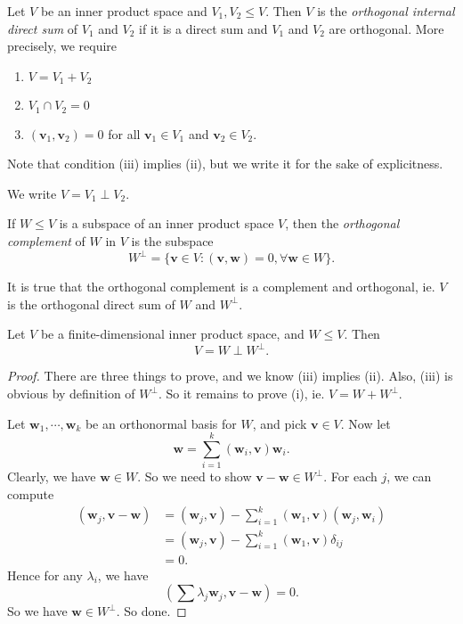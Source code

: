 \documentclass[a4paper]{article}
\begin{document}
\begin{defi}
  Let $V$ be an inner product space and $V_1, V_2 \leq V$. Then $V$ is the \emph{orthogonal internal direct sum} of $V_1$ and $V_2$ if it is a direct sum and $V_1$ and $V_2$ are orthogonal. More precisely, we require
  \begin{enumerate}
    \item $V = V_1 + V_2$
    \item $V_1 \cap V_2 = 0$
    \item $(\mathbf{v}_1, \mathbf{v}_2) = 0$ for all $\mathbf{v}_1 \in V_1$ and $\mathbf{v}_2 \in V_2$.
  \end{enumerate}
  Note that condition (iii) implies (ii), but we write it for the sake of explicitness.

  We write $V = V_1 \perp V_2$.
\end{defi}

\begin{defi}
  If $W \leq V$ is a subspace of an inner product space $V$, then the \emph{orthogonal complement} of $W$ in $V$ is the subspace
  \[
    W^\perp = \{\mathbf{v} \in V: (\mathbf{v}, \mathbf{w}) = 0, \forall \mathbf{w} \in W\}.
  \]
\end{defi}
It is true that the orthogonal complement is a complement and orthogonal, ie. $V$ is the orthogonal direct sum of $W$ and $W^\perp$.

\begin{prop}
  Let $V$ be a finite-dimensional inner product space, and $W \leq V$. Then
  \[
    V = W \perp W^\perp.
  \]
\end{prop}

\begin{proof}
  There are three things to prove, and we know (iii) implies (ii). Also, (iii) is obvious by definition of $W^\perp$. So it remains to prove (i), ie. $V = W + W^\perp$.

  Let $\mathbf{w}_1, \cdots, \mathbf{w}_k$ be an orthonormal basis for $W$, and pick $\mathbf{v}\in V$. Now let
  \[
    \mathbf{w} = \sum_{i = 1}^k (\mathbf{w}_i, \mathbf{v}) \mathbf{w}_i.
  \]
  Clearly, we have $\mathbf{w} \in W$. So we need to show $\mathbf{v} - \mathbf{w} \in W^\perp$. For each $j$, we can compute
  \begin{align*}
    (\mathbf{w}_j, \mathbf{v} - \mathbf{w}) &= (\mathbf{w}_j, \mathbf{v}) - \sum_{i = 1}^k (\mathbf{w}_1, \mathbf{v})(\mathbf{w}_j, \mathbf{w}_i)\\
    &= (\mathbf{w}_j, \mathbf{v}) - \sum_{i = 1}^k (\mathbf{w}_1, \mathbf{v}) \delta_{ij}\\
    &= 0.
  \end{align*}
  Hence for any $\lambda_i$, we have
  \[
    \left(\sum \lambda_j \mathbf{w}_j, \mathbf{v} - \mathbf{w}\right) = 0.
  \]
  So we have $\mathbf{w} \in W^\perp$. So done.
\end{proof}
\end{document}
